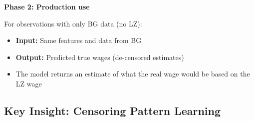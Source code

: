 \documentclass{article}
\begin{document}
\noindent\textbf{Phase 2: Production use} 

For observations with only BG data (no LZ):
\begin{itemize}
    \item \textbf{Input:} Same features and data from BG 
    \item \textbf{Output:} Predicted true wages (de-censored estimates)
    \item The model returns an estimate of what the real wage would be based on the LZ wage
\end{itemize}

\subsection{Key Insight: Censoring Pattern Learning}

\end{document}

